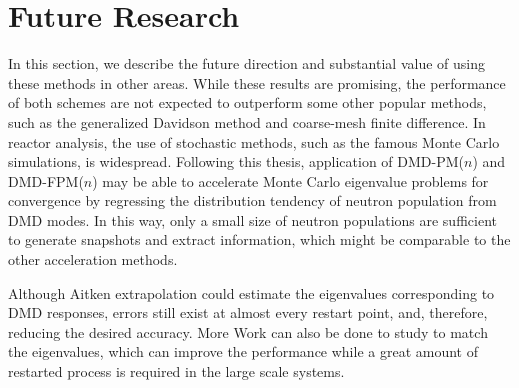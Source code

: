 \section{Future Research}
In this section, we describe the future direction and substantial value of using these methods in other areas.
While these results are promising, the performance of both schemes are not expected to outperform some other popular methods, such as the generalized Davidson method\cite{hamilton2011numerical} and coarse-mesh finite difference\cite{smith_1983}.
In reactor analysis, the use of stochastic methods, such as the famous Monte Carlo simulations, is widespread.
Following this thesis, application of DMD-PM($n$) and DMD-FPM($n$) may be able to accelerate Monte Carlo eigenvalue problems for convergence by regressing the distribution tendency of neutron population from DMD modes.
In this way, only a small size of neutron populations are sufficient to generate snapshots and extract information, which might be comparable to the other acceleration methods.

Although Aitken extrapolation could estimate the eigenvalues corresponding to DMD responses, errors still exist at almost every restart point, and, therefore, reducing the desired accuracy. 
More Work can also be done to study to match the eigenvalues, which can improve the performance while a great amount of restarted process is required in the large scale systems.



